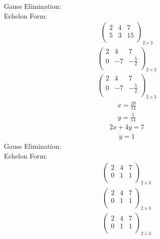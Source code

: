 \documentclass{article}
\begin{document}
Gauss Elimination:\\
Echelon Form:\\
\begin{align*}
\left(
\begin{array}{cc|c}
2 & 4 & 7\\
5 & 3 & 15\\
\end{array}
\right)_{2\times 3}
\end{align*}
\begin{align*}
\left(
\begin{array}{cc|c}
2 & 4 & 7\\
0 & -7 & -\frac{5}{2}\\
\end{array}
\right)_{2\times 3}
\end{align*}
\begin{align*}
\left(
\begin{array}{cc|c}
2 & 4 & 7\\
0 & -7 & -\frac{5}{2}\\
\end{array}
\right)_{2\times 3}
\end{align*}
\begin{align*}
x=\frac{39}{14}\end{align*}
\begin{align*}
y=\frac{5}{14}\end{align*}
\begin{align*}
2x + 4y=7\end{align*}
\begin{align*}
y=1\end{align*}
Gauss Elimination:\\
Echelon Form:\\
\begin{align*}
\left(
\begin{array}{cc|c}
2 & 4 & 7\\
0 & 1 & 1\\
\end{array}
\right)_{2\times 3}
\end{align*}
\begin{align*}
\left(
\begin{array}{cc|c}
2 & 4 & 7\\
0 & 1 & 1\\
\end{array}
\right)_{2\times 3}
\end{align*}
\begin{align*}
\left(
\begin{array}{cc|c}
2 & 4 & 7\\
0 & 1 & 1\\
\end{array}
\right)_{2\times 3}
\end{align*}
\end{document}
